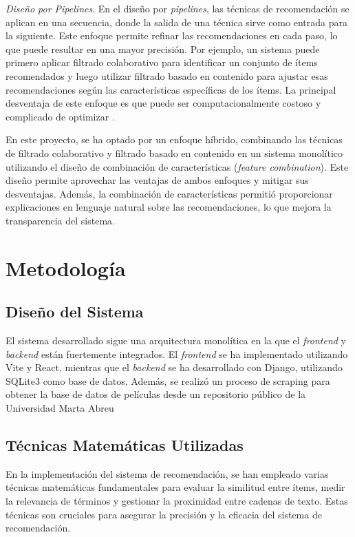 \documentclass{llncs}
\begin{document}
	\textit{Diseño por Pipelines}.
	En el diseño por \textit{pipelines}, las técnicas de recomendación se aplican en una secuencia, donde la salida de una técnica sirve como entrada para la siguiente. Este enfoque permite refinar las recomendaciones en cada paso, lo que puede resultar en una mayor precisión. Por ejemplo, un sistema puede primero aplicar filtrado colaborativo para identificar un conjunto de ítems recomendados y luego utilizar filtrado basado en contenido para ajustar esas recomendaciones según las características específicas de los ítems. La principal desventaja de este enfoque es que puede ser computacionalmente costoso y complicado de optimizar \cite{jannach2010recommender}.
	
	En este proyecto, se ha optado por un enfoque híbrido, combinando las técnicas de filtrado colaborativo y filtrado basado en contenido en un sistema monolítico utilizando el diseño de combinación de características (\textit{feature combination}). Este diseño permite aprovechar las ventajas de ambos enfoques y mitigar sus desventajas. Además, la combinación de características permitió proporcionar explicaciones en lenguaje natural sobre las recomendaciones, lo que mejora la transparencia del sistema.
	
	
	
	\section{Metodología}
	\subsection{Diseño del Sistema}
	El sistema desarrollado sigue una arquitectura monolítica en la que el 	\textit{frontend} y 	\textit{backend} están fuertemente integrados. El 	\textit{frontend} se ha implementado utilizando Vite y React, mientras que el 	\textit{backend} se ha desarrollado con Django, utilizando SQLite3 como base de datos. Además, se realizó un proceso de scraping para obtener la base de datos de películas desde un repositorio público de la Universidad Marta Abreu\cite{uclv}
	
	\subsection{Técnicas Matemáticas Utilizadas}
	En la implementación del sistema de recomendación, se han empleado varias técnicas matemáticas fundamentales para evaluar la similitud entre ítems, medir la relevancia de términos y gestionar la proximidad entre cadenas de texto. Estas técnicas son cruciales para asegurar la precisión y la eficacia del sistema de recomendación.
	
\end{document}
